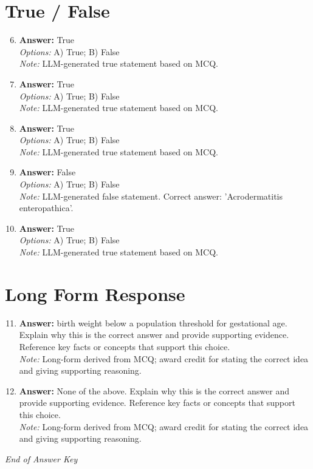 \documentclass[12pt]{article}
\begin{document}
\section*{True / False}
\begin{enumerate}[label=\arabic*.]
\setcounter{enumi}{5}
\item \textbf{Answer:} True
\\ \textit{Options:} A) True; B) False
\\ \textit{Note:} LLM-generated true statement based on MCQ.
\item \textbf{Answer:} True
\\ \textit{Options:} A) True; B) False
\\ \textit{Note:} LLM-generated true statement based on MCQ.
\item \textbf{Answer:} True
\\ \textit{Options:} A) True; B) False
\\ \textit{Note:} LLM-generated true statement based on MCQ.
\item \textbf{Answer:} False
\\ \textit{Options:} A) True; B) False
\\ \textit{Note:} LLM-generated false statement. Correct answer: 'Acrodermatitis enteropathica'.
\item \textbf{Answer:} True
\\ \textit{Options:} A) True; B) False
\\ \textit{Note:} LLM-generated true statement based on MCQ.
\end{enumerate}

\section*{Long Form Response}
\begin{enumerate}[label=\arabic*.]
\setcounter{enumi}{10}
\item \textbf{Answer:} birth weight below a population threshold for gestational age. Explain why this is the correct answer and provide supporting evidence. Reference key facts or concepts that support this choice.
\\ \textit{Note:} Long-form derived from MCQ; award credit for stating the correct idea and giving supporting reasoning.
\item \textbf{Answer:} None of the above. Explain why this is the correct answer and provide supporting evidence. Reference key facts or concepts that support this choice.
\\ \textit{Note:} Long-form derived from MCQ; award credit for stating the correct idea and giving supporting reasoning.
\end{enumerate}

\vfill
\noindent\textit{End of Answer Key}
\end{document}
